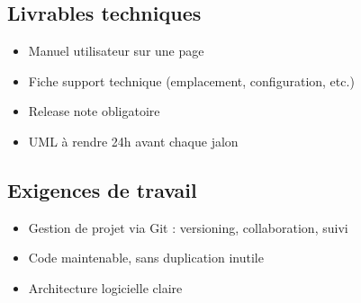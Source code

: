 \documentclass[12pt]{article}
\begin{document}
\subsection*{Livrables techniques}
\begin{itemize}
    \item Manuel utilisateur sur une page
    \item Fiche support technique (emplacement, configuration, etc.)
    \item Release note obligatoire
    \item UML à rendre 24h avant chaque jalon
\end{itemize}

\subsection*{Exigences de travail}
\begin{itemize}
    \item Gestion de projet via Git : versioning, collaboration, suivi
    \item Code maintenable, sans duplication inutile
    \item Architecture logicielle claire
\end{itemize}
\end{document}
